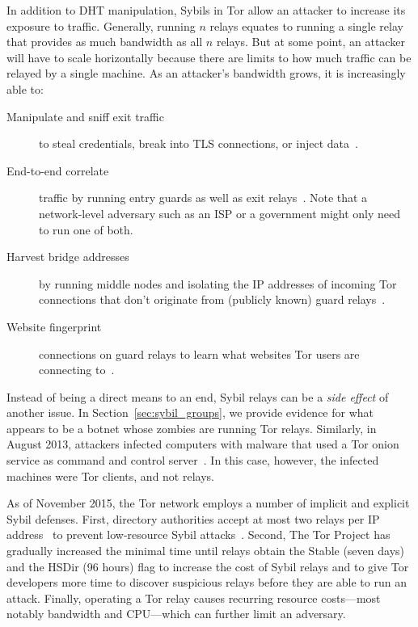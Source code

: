 In addition to DHT manipulation, Sybils in Tor allow an attacker to increase its
exposure to traffic.  Generally, running $n$ relays equates to running a single
relay that provides as much bandwidth as all $n$ relays.  But at some point, an
attacker will have to scale horizontally because there are limits to how much
traffic can be relayed by a single machine.  As an attacker's bandwidth grows,
it is increasingly able to:
\begin{description}
	\item[Manipulate and sniff exit traffic] to steal credentials, break into
		TLS connections, or inject data~\cite{Winter2014a}.
	\item[End-to-end correlate] traffic by running entry guards as well as exit
		relays~\cite{Johnson2013a}.  Note that a network-level adversary such as
		an ISP or a government might only need to run one of both.
	\item[Harvest bridge addresses] by running middle nodes and isolating the
		IP addresses of incoming Tor connections that don't originate from
		(publicly known) guard relays~\cite{Ling2012a}.
	\item[Website fingerprint] connections on guard relays to learn what
		websites Tor users are connecting to~\cite{Juarez2014a}.
\end{description}

Instead of being a direct means to an end, Sybil relays can be a \emph{side
effect} of another issue.  In Section~\ref{sec:sybil_groups}, we provide
evidence for what appears to be a botnet whose zombies are running Tor relays.
Similarly, in August 2013, attackers infected computers with malware that used a
Tor onion service as command and control server~\cite{Hopper2014a}.  In this
case, however, the infected machines were Tor clients, and not relays.

As of November 2015, the Tor network employs a number of implicit and explicit
Sybil defenses.  First, directory authorities accept at most two relays per IP
address~\cite{Bauer2007b} to prevent low-resource Sybil
attacks~\cite{Bauer2007a}.  Second, The Tor Project has gradually increased the
minimal time until relays obtain the Stable (seven days) and the HSDir (96
hours) flag to increase the cost of Sybil relays and to give Tor developers more
time to discover suspicious relays before they are able to run an attack.
Finally, operating a Tor relay causes recurring resource costs---most notably
bandwidth and CPU---which can further limit an adversary.

